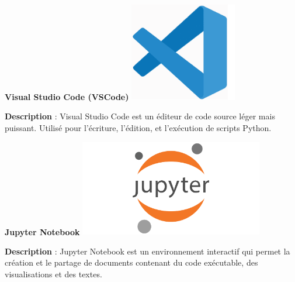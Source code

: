 \begin{minipage}[t]{0.46\textwidth}
	\begin{center}
		\textbf{Visual Studio Code (VSCode)}
		\includegraphics[width=0.35\textwidth]{images/logoVSCODE}\\
	\end{center} 
	\textbf{Description} : Visual Studio Code est un éditeur de code source léger mais puissant. Utilisé pour l'écriture, l'édition, et l'exécution de scripts Python.
\end{minipage}
\hfill
\begin{minipage}[t]{0.46\textwidth}
	 
	\begin{center}
		\textbf{Jupyter Notebook}
		\includegraphics[width=0.6\textwidth]{images/logoJupyter}\\
	\end{center} %
    \textbf{Description} : Jupyter Notebook est un environnement interactif qui permet la création et le partage de documents contenant du code exécutable, des visualisations et des textes. %
\end{minipage}
\vspace{8em}

